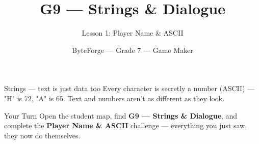 \documentclass[aspectratio=169]{beamer}
\title{G9 — Strings \& Dialogue}
\subtitle{Lesson 1: Player Name \& ASCII}
\author{ByteForge --- Grade 7 --- Game Maker}
\date{}
\begin{document}
\begin{frame}
    \titlepage
\end{frame}

\begin{frame}{Strings — text is just data too}
    \Large
    Every character is secretly a number (ASCII) — "H" is 72, "A" is 65. Text and numbers aren't as different as they look.
\end{frame}

\begin{frame}{Your Turn}
    \Large
    Open the student map, find \textbf{G9 — Strings \& Dialogue}, and complete
    the \textbf{Player Name \& ASCII} challenge --- everything you just saw, they now do themselves.
\end{frame}
\end{document}
